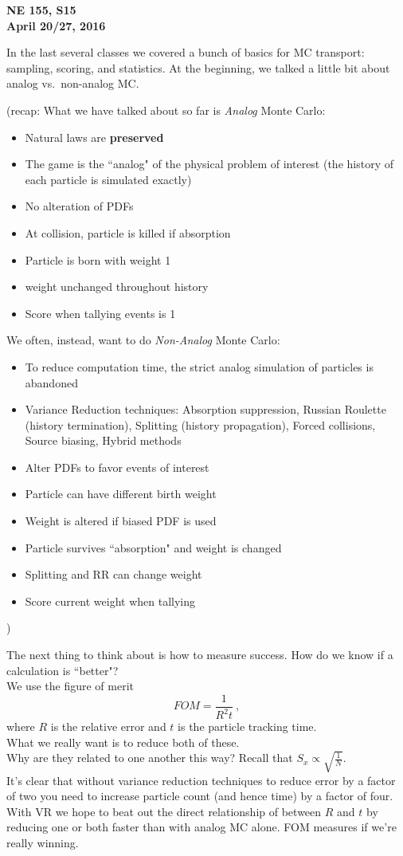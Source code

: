 \documentclass[12pt]{article}
\begin{document}
\begin{center}
{\bf NE 155, S15\\
April 20/27, 2016 
}
\end{center}

In the last several classes we covered a bunch of basics for MC transport: sampling, scoring, and statistics. At the beginning, we talked a little bit about analog vs.\ non-analog MC.

(recap: What we have talked about so far is \textit{Analog} Monte Carlo:
\begin{itemize}
    \item Natural laws are \textbf{preserved}
    \item The game is the ``analog" of the physical problem of interest (the history of each particle is simulated exactly)
    \item No alteration of PDFs
    \item At collision, particle is killed if absorption
    \item Particle is born with weight 1
    \item weight unchanged throughout history
    \item Score when tallying events is 1
\end{itemize}
%
We often, instead, want to do \textit{Non-Analog} Monte Carlo:
\begin{itemize}
    \item To reduce computation time, the strict analog simulation of particles is abandoned
    \item Variance Reduction techniques: Absorption suppression, Russian Roulette (history termination), Splitting (history propagation), Forced collisions, Source biasing, Hybrid methods
    \item Alter PDFs to favor events of interest
    \item Particle can have different birth weight
    \item Weight is altered if biased PDF is used
    \item Particle survives ``absorption" and weight is changed
    \item Splitting and RR can change weight
    \item Score current weight when tallying
\end{itemize}
)

The next thing to think about is how to measure success. How do we know if a calculation is ``better"?\\
We use the figure of merit
\[
FOM =\frac{1}{R^2 t}\:,
\]
where $R$ is the relative error and $t$ is the particle tracking time.\\
What we really want is to reduce both of these. \\
Why are they related to one another this way? Recall that $S_x \propto \sqrt{\frac{1}{N}}$.\\
It's clear that without variance reduction techniques to reduce error by a factor of two you need to increase particle count (and hence time) by a factor of four.\\
With VR we hope to beat out the direct relationship of between $R$ and $t$ by reducing one or both faster than with analog MC alone. FOM measures if we're really winning.
\end{document}

